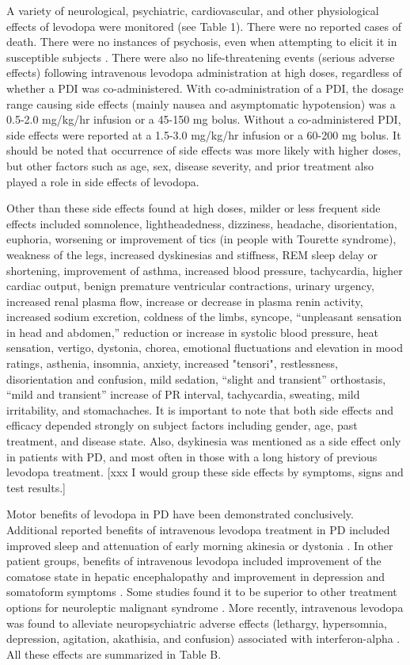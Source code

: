A variety of neurological, psychiatric, cardiovascular, and other physiological effects of levodopa  were monitored (see Table 1). There were no reported cases of death.  There were no instances of psychosis, even when attempting to elicit it in susceptible subjects \cite{9748031}.  There were also no life-threatening events (serious adverse effects) following intravenous levodopa administration at high doses, regardless of whether a PDI was co-administered.  With co-administration of a PDI, the dosage range causing side effects (mainly nausea and asymptomatic hypotension) was a 0.5-2.0 mg/kg/hr infusion or a 45-150 mg bolus.  Without a co-administered PDI, side effects were reported at a 1.5-3.0 mg/kg/hr infusion or a 60-200 mg bolus. It should be noted that occurrence of side effects was more likely with higher doses, but other factors such as age, sex, disease severity, and prior treatment also played a role in side effects of levodopa.  

Other than these side effects found at high doses, milder or less frequent side effects included somnolence, lightheadedness, dizziness, headache, disorientation, euphoria, worsening or improvement of tics (in people with Tourette syndrome), weakness of the legs, increased dyskinesias and stiffness, REM sleep delay or shortening, improvement of asthma, increased blood pressure, tachycardia, higher cardiac output, benign premature ventricular contractions, urinary urgency, increased renal plasma flow, increase or decrease in plasma renin activity, increased sodium excretion, coldness of the limbs, syncope, “unpleasant sensation in head and abdomen,” reduction or increase in systolic blood pressure, heat sensation, vertigo, dystonia, chorea, emotional fluctuations and elevation in mood ratings, asthenia, insomnia, anxiety, increased "tensori", restlessness, disorientation and confusion, mild sedation, “slight and transient” orthostasis, “mild and transient” increase of PR interval, tachycardia, sweating, mild irritability, and stomachaches.  It is important to note that both side effects and efficacy depended strongly on subject factors including gender, age, past treatment, and disease state.  Also, dsykinesia was mentioned as a side effect only in patients with PD, and most often in those with a long history of previous levodopa treatment. [xxx I would group these side effects by symptoms, signs and test results.]

Motor benefits of levodopa in PD have been demonstrated conclusively. Additional reported benefits of intravenous levodopa treatment in PD included improved sleep \cite{6722513} and attenuation of early morning akinesia or dystonia \cite{3601092}.  In other patient groups, benefits of intravenous levodopa included improvement of the comatose state in hepatic encephalopathy \cite{4544184} and improvement in depression and somatoform symptoms \cite{5898634}.  Some studies found it to be superior to other treatment options for neuroleptic malignant syndrome \cite{9099421}.  More recently, intravenous levodopa was found to alleviate neuropsychiatric adverse effects (lethargy, hypersomnia, depression, agitation, akathisia, and confusion) associated with interferon-alpha \cite{10682234}. All these effects are summarized in Table B.